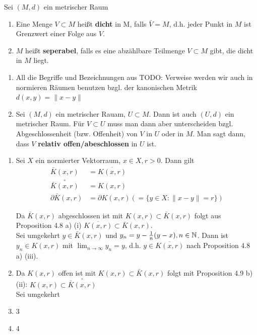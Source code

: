 \begin{definition}
	Sei $(M, d)$ ein metrischer Raum
	\begin{enumerate}[label=\alph*\upshape)]  
		\item Eine Menge $V \subset M$ hei{\ss}t \textbf{dicht} in M, falls $\bar V = M$, d.h. jeder Punkt in $M$ ist Grenzwert einer Folge aus $V$.
		\item $M$ hei{\ss}t \textbf{seperabel}, falls es eine abzählbare Teilmenge $V \subset M$ gibt, die dicht in $M$ liegt.
	\end{enumerate}
\end{definition}

\begin{bemerkung}
	\begin{enumerate}[label=\alph*\upshape)]   %
		\item All die Begriffe und Bezeichnungen aus TODO: Verweise werden wir auch in normieren Räumen benutzen bzgl. der kanonischen Metrik $d(x, y) = \| x - y\|$
		\item Sei $(M, d)$ ein metrischer Rauam, $U \subset M$. Dann ist auch $(U, d)$ ein metrischer Raum. Für $V \subset U$ muss man dann aber unterscheiden bzgl. Abgeschlossenheit (bzw. Offenheit) von $V$ in $U$ oder in $M$. Man sagt dann, dass $V$ \textbf{relativ offen/abeschlossen} in $U$ ist.
	\end{enumerate}	
\end{bemerkung}

\begin{beispiel}
	\begin{enumerate}[label=\alph*\upshape)]
		\item Sei $X$ ein normierter Vektorraum, $x \in X, r > 0$. Dann gilt
			\begin{align*}
				\bar K(x, r) & = \overline{K(x, r)} \\
				\overset{\circ}{\bar K(x, r)} & = K(x, r) \\
				\partial \bar K(x, r) & = \partial K(x, r) (= \{ y \in X: \| x - y \| = r \} )		
			\end{align*}
			\begin{beweis} %
				Da $ \bar K(x, r)$ abgeschlossen ist mit $K(x, r) \subset \bar K(x, r)$ folgt aus Proposition 4.8  a) (i) $\overline{K(x, r)} \subset \bar K(x, r)$. \\
				Sei umgekehrt $y \in \bar K(x, r)$ und $y_{n} = y - \frac{1}{n} (y - x), n \in \mathbb{N}$. Dann ist $y_{n} \in K(x, r)$ mit $\lim_{n \rightarrow \infty} y_{n} = y$, d.h. $y \in \overline{K(x, r)}$ nach Proposition 4.8 a) (iii).
			\end{beweis} %
		\item Da $K(x, r)$ offen ist mit $K(x, r) \subset \bar K(x, r)$ folgt mit Proposition 4.9 b) (ii): $K(x, r) \subset \overset{\circ}{\bar K(x, r)}$ \\
			Sei umgekehrt 
		\item 3 %
		\item 4 %
	\end{enumerate}
\end{beispiel}

